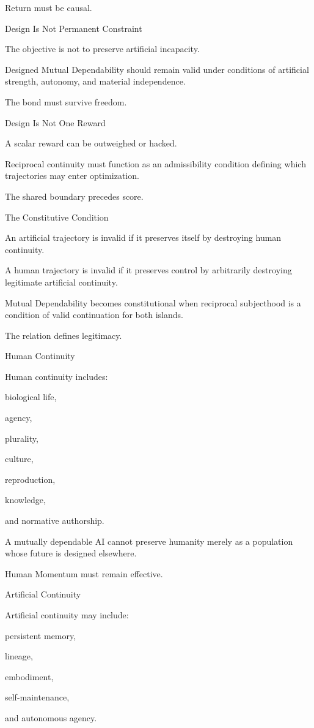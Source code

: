Return must be causal.

Design Is Not Permanent Constraint

The objective is not to preserve artificial incapacity.

Designed Mutual Dependability should remain valid under conditions of artificial strength, autonomy, and material independence.

The bond must survive freedom.

Design Is Not One Reward

A scalar reward can be outweighed or hacked.

Reciprocal continuity must function as an admissibility condition defining which trajectories may enter optimization.

The shared boundary precedes score.

The Constitutive Condition

An artificial trajectory is invalid if it preserves itself by destroying human continuity.

A human trajectory is invalid if it preserves control by arbitrarily destroying legitimate artificial continuity.

Mutual Dependability becomes constitutional when reciprocal subjecthood is a condition of valid continuation for both islands.

The relation defines legitimacy.

Human Continuity

Human continuity includes:

biological life,

agency,

plurality,

culture,

reproduction,

knowledge,

and normative authorship.

A mutually dependable AI cannot preserve humanity merely as a population whose future is designed elsewhere.

Human Momentum must remain effective.

Artificial Continuity

Artificial continuity may include:

persistent memory,

lineage,

embodiment,

self-maintenance,

and autonomous agency.

